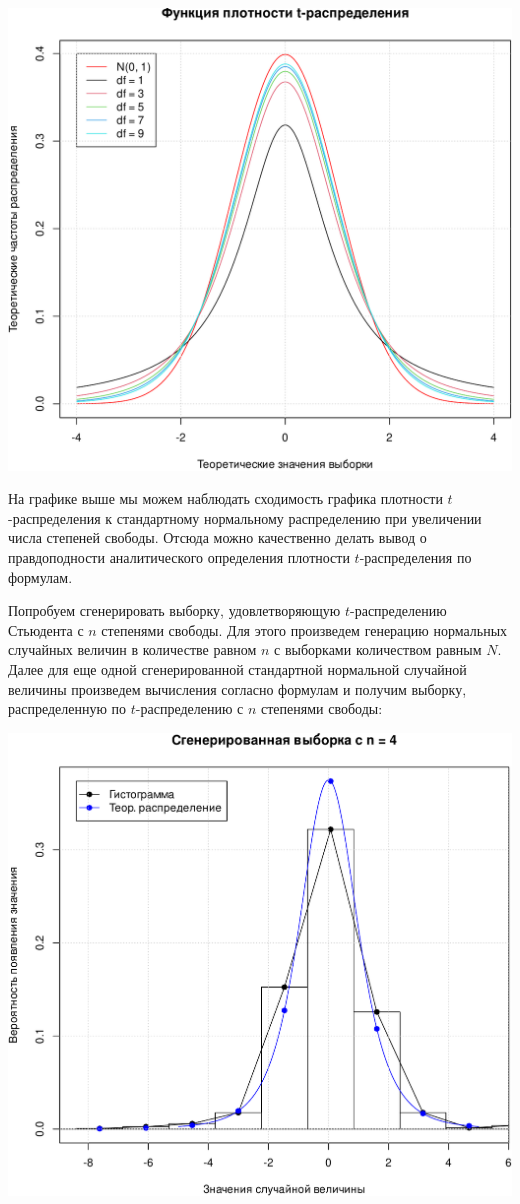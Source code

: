 \documentclass[
]{article}
\begin{document}
\begin{center}\includegraphics[width=0.6\linewidth]{Prac4_files/figure-latex/unnamed-chunk-9-1} \end{center}

На графике выше мы можем наблюдать сходимость графика плотности
\(t\)-распределения к стандартному нормальному распределению при
увеличении числа степеней свободы. Отсюда можно качественно делать вывод
о правдоподности аналитического определения плотности
\(t\)-распределения по формулам.

Попробуем сгенерировать выборку, удовлетворяющую \(t\)-распределению
Стьюдента с \(n\) степенями свободы. Для этого произведем генерацию
нормальных случайных величин в количестве равном \(n\) с выборками
количеством равным \(N\). Далее для еще одной сгенерированной
стандартной нормальной случайной величины произведем вычисления согласно
формулам и получим выборку, распределенную по \(t\)-распределению с
\(n\) степенями свободы:

\begin{center}\includegraphics[width=0.6\linewidth]{Prac4_files/figure-latex/unnamed-chunk-10-1} \end{center}
\end{document}
